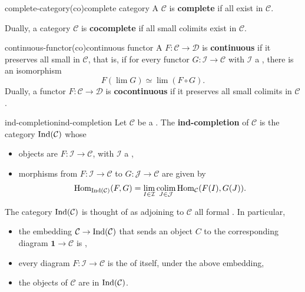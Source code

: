 \begin{topic}{complete-category}{(co)complete category}
    A  $\mathcal{C}$ is \textbf{complete} if all   exist in $\mathcal{C}$.
    
    Dually, a category $\mathcal{C}$ is \textbf{cocomplete} if all small colimits exist in $\mathcal{C}$.
\end{topic}

\begin{topic}{continuous-functor}{(co)continuous functor}
    A  $F : \mathcal{C} \to \mathcal{D}$ is \textbf{continuous} if it preserves all small  in $\mathcal{C}$, that is, if for every functor $G : \mathcal{I} \to \mathcal{C}$ with $\mathcal{I}$ a , there is an isomorphism
    \[ F(\lim G) \simeq \lim(F \circ G) . \]
    Dually, a functor $F : \mathcal{C} \to \mathcal{D}$ is \textbf{cocontinuous} if it preserves all small colimits in $\mathcal{C}$.
\end{topic}

\begin{topic}{ind-completion}{ind-completion}
    Let $\mathcal{C}$ be a . The \textbf{ind-completion} of $\mathcal{C}$ is the category $\textup{Ind}(\mathcal{C})$ whose
    \begin{itemize}
        \item objects are  $F : \mathcal{I} \to \mathcal{C}$, with $\mathcal{I}$ a  ,
        \item morphisms from $F : \mathcal{I} \to \mathcal{C}$ to $G : \mathcal{J} \to \mathcal{C}$ are given by
        \[ \operatorname{Hom}_{\textup{Ind}(\mathcal{C})}(F, G) = \lim_{I \in \mathcal{I}} \operatorname*{colim}_{J \in \mathcal{J}} \operatorname{Hom}_\mathcal{C}(F(I), G(J)) . \]
    \end{itemize}
    The category $\textup{Ind}(\mathcal{C})$ is thought of as adjoining to $\mathcal{C}$ all formal . In particular,
    \begin{itemize}
        \item the embedding $\mathcal{C} \to \textup{Ind}(\mathcal{C})$ that sends an object $C$ to the corresponding diagram $\textbf{1} \to \mathcal{C}$ is  ,
        \item every diagram $F : \mathcal{I} \to \mathcal{C}$ is the  of itself, under the above embedding,
        \item the objects of $\mathcal{C}$ are  in $\textup{Ind}(\mathcal{C})$.
    \end{itemize}
\end{topic}

